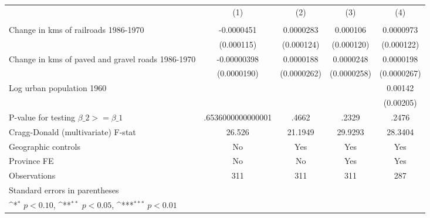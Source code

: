 {
\def\sym#1{\ifmmode^{#1}\else\(^{#1}\)\fi}
\begin{tabular}{l*{4}{c}}
\hline\hline
                &\multicolumn{1}{c}{(1)}&\multicolumn{1}{c}{(2)}&\multicolumn{1}{c}{(3)}&\multicolumn{1}{c}{(4)}\\
                &\multicolumn{1}{c}{}&\multicolumn{1}{c}{}&\multicolumn{1}{c}{}&\multicolumn{1}{c}{}\\
\hline
Change in kms of railroads 1986-1970&-0.0000451         &0.0000283         & 0.000106         &0.0000973         \\
                &(0.000115)         &(0.000124)         &(0.000120)         &(0.000122)         \\
[1em]
Change in kms of paved and gravel roads 1986-1970&-0.00000398         &0.0000188         &0.0000248         &0.0000198         \\
                &(0.0000190)         &(0.0000262)         &(0.0000258)         &(0.0000267)         \\
[1em]
Log urban population 1960&                  &                  &                  &  0.00142         \\
                &                  &                  &                  &(0.00205)         \\
\hline
P-value for testing $\beta\_{2} >= \beta\_{1}$&.6536000000000001         &    .4662         &    .2329         &    .2476         \\
Cragg-Donald (multivariate) F-stat&   26.526         &  21.1949         &  29.9293         &  28.3404         \\
Geographic controls&       No         &      Yes         &      Yes         &      Yes         \\
Province FE     &       No         &       No         &      Yes         &      Yes         \\
Observations    &      311         &      311         &      311         &      287         \\
\hline\hline
\multicolumn{5}{l}{\footnotesize Standard errors in parentheses}\\
\multicolumn{5}{l}{\footnotesize \sym{*} \(p<0.10\), \sym{**} \(p<0.05\), \sym{***} \(p<0.01\)}\\
\end{tabular}
}
